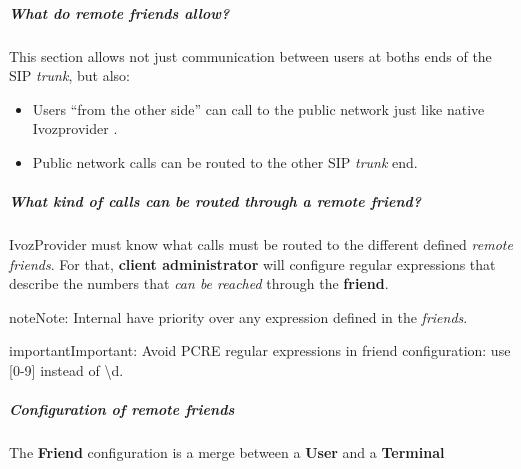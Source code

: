 \documentclass[letterpaper,10pt,english]{sphinxmanual}
\begin{document}
\subparagraph{What do remote friends allow?}
\label{administration_portal/client/vpbx/routing_endpoints/friends/remote_friends:what-do-remote-friends-allow}
This section allows not just communication between users at boths ends of the
SIP \emph{trunk}, but also:
\begin{itemize}
\item {} 
Users ``from the other side'' can call to the public network just like native
Ivozprovider {\hyperref[administration_portal/client/vpbx/users:users]{}}.

\item {} 
Public network calls can be routed to the other SIP \emph{trunk} end.

\end{itemize}


\subparagraph{What kind of calls can be routed through a \emph{remote friend}?}
\label{administration_portal/client/vpbx/routing_endpoints/friends/remote_friends:what-kind-of-calls-can-be-routed-through-a-remote-friend}
IvozProvider must know what calls must be routed to the different defined \emph{remote friends}.
For that, \textbf{client administrator} will configure regular expressions that
describe the numbers that \emph{can be reached} through the \textbf{friend}.

\begin{notice}{note}{Note:}
Internal {\hyperref[administration_portal/client/vpbx/extensions:extensions]{}} have priority over any expression
defined in the \emph{friends}.
\end{notice}

\begin{notice}{important}{Important:}
Avoid PCRE regular expressions in friend configuration: use {[}0-9{]} instead of \textbackslash{}d.
\end{notice}


\subparagraph{Configuration of remote friends}
\label{administration_portal/client/vpbx/routing_endpoints/friends/remote_friends:configuration-of-remote-friends}
The \textbf{Friend} configuration is a merge between a \textbf{User} and a \textbf{Terminal}
\end{document}
